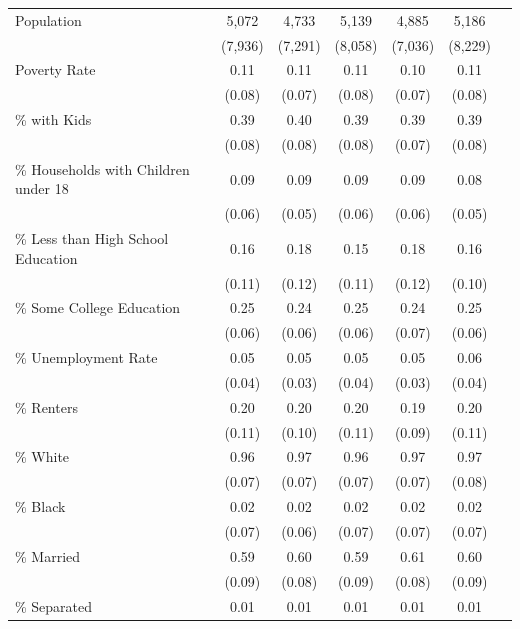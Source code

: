 \begin{longtable}{p{4cm}cccccc}
    Population & 5,072 & 4,733 & 5,139 & 4,885 & 5,186 \\
                & (7,936) & (7,291) & (8,058) & (7,036) & (8,229) \\
    Poverty Rate & 0.11 & 0.11 & 0.11 & 0.10 & 0.11 \\
                    & (0.08) & (0.07) & (0.08) & (0.07) & (0.08) \\
    \% with Kids & 0.39 & 0.40 & 0.39 & 0.39 & 0.39 \\
                    & (0.08) & (0.08) & (0.08) & (0.07) & (0.08) \\
    \% Households with Children under 18 & 0.09 & 0.09 & 0.09 & 0.09 & 0.08 \\[-2.3em]
                                            & (0.06) & (0.05) & (0.06) & (0.06) & (0.05) \\
    \% Less than High School Education & 0.16 & 0.18 & 0.15 & 0.18 & 0.16 \\[-2.3em]
                                        & (0.11) & (0.12) & (0.11) & (0.12) & (0.10) \\
    \% Some College Education & 0.25 & 0.24 & 0.25 & 0.24 & 0.25 \\[-2.3em]
                                & (0.06) & (0.06) & (0.06) & (0.07) & (0.06) \\
    \% Unemployment Rate & 0.05 & 0.05 & 0.05 & 0.05 & 0.06 \\[-2.3em]
                            & (0.04) & (0.03) & (0.04) & (0.03) & (0.04) \\
    \% Renters & 0.20 & 0.20 & 0.20 & 0.19 & 0.20 \\
                & (0.11) & (0.10) & (0.11) & (0.09) & (0.11) \\
    \% White & 0.96 & 0.97 & 0.96 & 0.97 & 0.97 \\
                & (0.07) & (0.07) & (0.07) & (0.07) & (0.08) \\
    \% Black & 0.02 & 0.02 & 0.02 & 0.02 & 0.02 \\
                & (0.07) & (0.06) & (0.07) & (0.07) & (0.07) \\
    \% Married & 0.59 & 0.60 & 0.59 & 0.61 & 0.60 \\
                & (0.09) & (0.08) & (0.09) & (0.08) & (0.09) \\
    \% Separated & 0.01 & 0.01 & 0.01 & 0.01 & 0.01 \\

\end{longtable}
